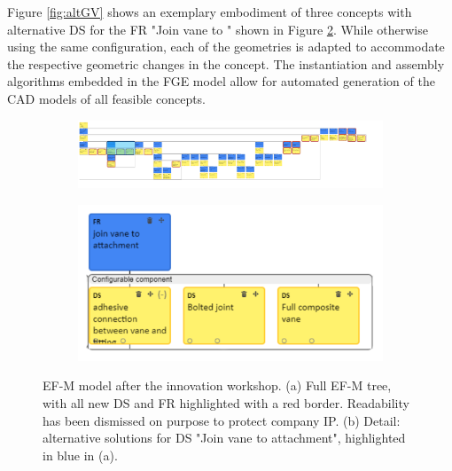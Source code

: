 \documentclass[aerospace,article,submit,moreauthors,pdftex]{Definitions/mdpi}
\newcommand{\revision}[1]{{{\color{ForestGreen}{{#1}}\color{black}}
    }{\ignorespaces}}
\begin{document}

Figure \ref{fig:altGV} shows an exemplary embodiment of three concepts with alternative DS for the FR "Join vane to \revision{attachment}" shown in Figure \ref{fig:efmAltFoot}.
While otherwise using the same configuration, each of the geometries is adapted to accommodate the respective geometric changes in the concept.
The instantiation and assembly algorithms embedded in the FGE model allow for automated generation of the CAD models of all feasible concepts.  

\begin{figure}[ht]
    \centering
    
        \begin{subfigure}[b]{0.6\textwidth}
            \centering
            \includegraphics[width=\textwidth]{figures/pdf/fullEFM.pdf}
            \caption{}
            \label{fig:fullEFM}
        \end{subfigure}
        \hfill
        \begin{subfigure}[b]{0.35\textwidth}
            \centering
            \includegraphics[width=\textwidth]{figures/pdf/efmDetail.pdf}
            \caption{}
            \label{fig:efmAltFoot}
        \end{subfigure}
        
    \caption{EF-M model after the innovation workshop.
    (a) Full EF-M tree, with all new DS and FR highlighted with a red border.
     Readability has been dismissed on purpose to protect company IP.
    (b) Detail: alternative solutions for DS "Join vane to attachment", highlighted in blue in (a).}
    \label{fig:efmResults}
\end{figure}
\end{document}
